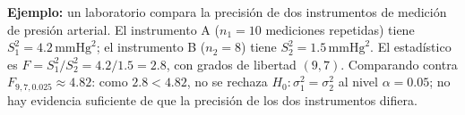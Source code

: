 \begin{solproblema}[prob:6277cc2]
	\textbf{Ejemplo:} un laboratorio compara la precisión de dos instrumentos de medición de presión arterial. El instrumento A ($n_1=10$ mediciones repetidas) tiene $S_1^2=4.2\,\text{mmHg}^2$; el instrumento B ($n_2=8$) tiene $S_2^2=1.5\,\text{mmHg}^2$. El estadístico es $F = S_1^2/S_2^2 = 4.2/1.5 = 2.8$, con grados de libertad $(9,7)$. Comparando contra $F_{9,7,0.025}\approx4.82$: como $2.8 < 4.82$, no se rechaza $H_0:\sigma_1^2=\sigma_2^2$ al nivel $\alpha=0.05$; no hay evidencia suficiente de que la precisión de los dos instrumentos difiera.
\end{solproblema}
